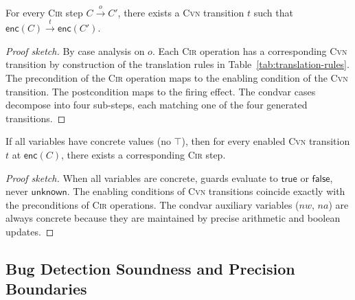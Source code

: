 \begin{theorem}
\label{thm:forward}
For every \textsc{Cir} step $C \xrightarrow{o} C'$, there exists a \textsc{Cvn} transition $t$ such that
$\mathsf{enc}(C) \xrightarrow{t} \mathsf{enc}(C')$.
\end{theorem}

\begin{proof}[Proof sketch]
By case analysis on $o$. Each \textsc{Cir} operation has a
corresponding \textsc{Cvn} transition by construction of the
translation rules in Table~\ref{tab:translation-rules}. The
precondition of the \textsc{Cir} operation maps to the enabling
condition of the \textsc{Cvn} transition. The postcondition maps to the firing effect. The condvar cases decompose into
four sub-steps, each matching one of the four generated transitions.
\end{proof}

\begin{theorem}
\label{thm:backward}
If all variables have concrete values (no $\top$), then for every enabled \textsc{Cvn} transition $t$ at $\mathsf{enc}(C)$, there exists a corresponding \textsc{Cir} step.
\end{theorem}

\begin{proof}[Proof sketch]
When all variables are concrete, guards evaluate to
$\mathsf{true}$ or $\mathsf{false}$, never $\mathsf{unknown}$.
The enabling conditions of \textsc{Cvn} transitions coincide
exactly with the preconditions of \textsc{Cir} operations.
The condvar auxiliary variables ($\mathit{nw}$, $\mathit{na}$) are always concrete because they are maintained by precise arithmetic and boolean updates.
\end{proof}

\subsection{Bug Detection Soundness and Precision Boundaries}
\label{subsec:soundness}

